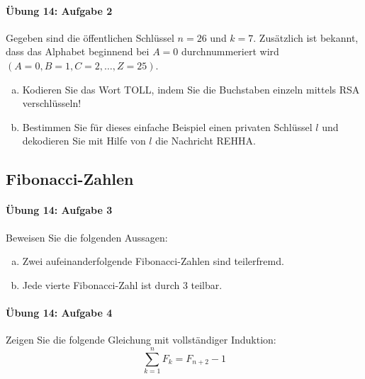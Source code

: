 \documentclass
[
  draft    = true,
  fontsize = 11pt,
  parskip  = half-,
  BCOR     = 0pt,
  DIV      = 11,
  ngerman,
  dvipsnames
]
{scrartcl}
\begin{document}
\paragraph{Übung 14: Aufgabe 2}
Gegeben sind die öffentlichen Schlüssel $n=26$ und $k=7$. Zusätzlich
ist bekannt, dass das Alphabet beginnend bei $A=0$ durchnummeriert
wird $(A=0,B=1,C=2,\ldots,Z=25)$.
\begin{enumerate}[a)]
  \item Kodieren Sie das Wort \glqq{}TOLL\grqq, indem Sie die Buchstaben
        einzeln mittels RSA verschlüsseln!
  \item Bestimmen Sie für dieses einfache Beispiel einen privaten Schlüssel
        $l$ und dekodieren Sie mit Hilfe von $l$ die Nachricht \glqq{}REHHA\grqq.
\end{enumerate}

\subsection{Fibonacci-Zahlen}

\paragraph{Übung 14: Aufgabe 3}
Beweisen Sie die folgenden Aussagen:
\begin{enumerate}[a)]
  \item Zwei aufeinanderfolgende Fibonacci-Zahlen sind teilerfremd.
  \item Jede vierte Fibonacci-Zahl ist durch 3 teilbar.
\end{enumerate}

\paragraph{Übung 14: Aufgabe 4}
Zeigen Sie die folgende Gleichung mit vollständiger Induktion:
\begin{equation*}
  \sum_{k=1}^nF_k=F_{n+2}-1
\end{equation*}


\end{document}
